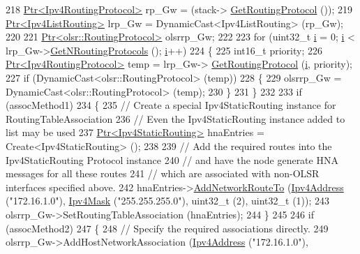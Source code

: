\begin{DoxyCode}
218   \hyperlink{classns3_1_1Ptr}{Ptr<Ipv4RoutingProtocol>} rp\_Gw = (stack->
      \hyperlink{classns3_1_1Ipv4_a62b179607cbea43b510447c422186da1}{GetRoutingProtocol} ());
219   \hyperlink{classns3_1_1Ptr}{Ptr<Ipv4ListRouting>} lrp\_Gw = DynamicCast<Ipv4ListRouting> (rp\_Gw);
220 
221   \hyperlink{classns3_1_1Ptr}{Ptr<olsr::RoutingProtocol>} olsrrp\_Gw;
222 
223   \textcolor{keywordflow}{for} (uint32\_t \hyperlink{bernuolliDistribution_8m_a6f6ccfcf58b31cb6412107d9d5281426}{i} = 0; \hyperlink{bernuolliDistribution_8m_a6f6ccfcf58b31cb6412107d9d5281426}{i} < lrp\_Gw->\hyperlink{classns3_1_1Ipv4ListRouting_ace90506497803859bebb5cbfa04b56ce}{GetNRoutingProtocols} ();  
      \hyperlink{bernuolliDistribution_8m_a6f6ccfcf58b31cb6412107d9d5281426}{i}++)
224     \{
225       int16\_t priority;
226       \hyperlink{classns3_1_1Ptr}{Ptr<Ipv4RoutingProtocol>} temp = lrp\_Gw->
      \hyperlink{classns3_1_1Ipv4ListRouting_a1c47488f8ed4775ff5c33add867652b9}{GetRoutingProtocol} (\hyperlink{bernuolliDistribution_8m_a6f6ccfcf58b31cb6412107d9d5281426}{i}, priority);
227       \textcolor{keywordflow}{if} (DynamicCast<olsr::RoutingProtocol> (temp))
228         \{
229           olsrrp\_Gw = DynamicCast<olsr::RoutingProtocol> (temp);
230         \}
231     \}
232 
233   \textcolor{keywordflow}{if} (assocMethod1)
234     \{
235       \textcolor{comment}{// Create a special Ipv4StaticRouting instance for RoutingTableAssociation}
236       \textcolor{comment}{// Even the Ipv4StaticRouting instance added to list may be used}
237       \hyperlink{classns3_1_1Ptr}{Ptr<Ipv4StaticRouting>} hnaEntries = Create<Ipv4StaticRouting> ();
238 
239       \textcolor{comment}{// Add the required routes into the Ipv4StaticRouting Protocol instance}
240       \textcolor{comment}{// and have the node generate HNA messages for all these routes}
241       \textcolor{comment}{// which are associated with non-OLSR interfaces specified above.}
242       hnaEntries->\hyperlink{classns3_1_1Ipv4StaticRouting_a8bf5eaa7ba49fe33c78c70d5560b6c39}{AddNetworkRouteTo} (\hyperlink{classns3_1_1Ipv4Address}{Ipv4Address} (\textcolor{stringliteral}{"172.16.1.0"}), 
      \hyperlink{classns3_1_1Ipv4Mask}{Ipv4Mask} (\textcolor{stringliteral}{"255.255.255.0"}), uint32\_t (2), uint32\_t (1));
243       olsrrp\_Gw->SetRoutingTableAssociation (hnaEntries);
244     \}
245 
246   \textcolor{keywordflow}{if} (assocMethod2)
247     \{
248       \textcolor{comment}{// Specify the required associations directly.}
249       olsrrp\_Gw->AddHostNetworkAssociation (\hyperlink{classns3_1_1Ipv4Address}{Ipv4Address} (\textcolor{stringliteral}{"172.16.1.0"}), 

\end{DoxyCode}
